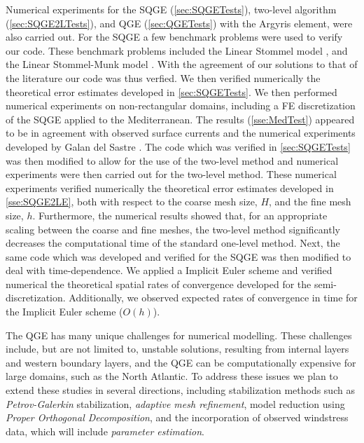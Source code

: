 Numerical experiments for the SQGE (\autoref{sec:SQGETests}), two-level
algorithm (\autoref{sec:SQGE2LTests}), and QGE (\autoref{sec:QGETests}) with the
Argyris element, were also carried out. For the SQGE a few benchmark problems
were used to verify our code. These benchmark problems included the Linear
Stommel model \cite{Vallis06,Myers}, and the Linear Stommel-Munk model
\cite{Cascon}. With the agreement of our solutions to that of the literature our
code was thus verfied. We then verified numerically the theoretical error
estimates developed in \autoref{sec:SQGETests}. We then performed numerical
experiments on non-rectangular domains, including a FE discretization of the
SQGE applied to the Mediterranean. The results (\autoref{sse:MedTest}) appeared
to be in agreement with observed surface currents and the numerical experiments
developed by Galan del Sastre \cite{Galan-del-Sastre2004}. The code which was
verified in \autoref{sec:SQGETests} was then modified to allow for the use of
the two-level method and numerical experiments were then carried out for the
two-level method.  These numerical experiments verified numerically the
theoretical error estimates developed in \autoref{sse:SQGE2LE}, both with
respect to the coarse mesh size, $H$, and the fine mesh size, $h$.  Furthermore,
the numerical results showed that, for an appropriate scaling between the coarse
and fine meshes, the two-level method significantly decreases the computational
time of the standard one-level method. Next, the same code which was developed
and verified for the SQGE was then modified to deal with time-dependence. We
applied a Implicit Euler scheme and verified numerical the theoretical spatial
rates of convergence developed for the semi-discretization. Additionally, we
observed expected rates of convergence in time for the Implicit Euler scheme
($O(h)$).

The QGE has many unique challenges for numerical modelling. These challenges
include, but are not limited to, unstable solutions, resulting from internal
layers and western boundary layers, and the QGE can be computationally expensive
for large domains, such as the North Atlantic. To address these issues we plan
to extend these studies in several directions, including stabilization methods
such as \emph{Petrov-Galerkin} stabilization, \emph{adaptive mesh refinement},
model reduction using \emph{Proper Orthogonal Decomposition}, and the
incorporation of observed windstress data, which will include \emph{parameter
estimation}.
